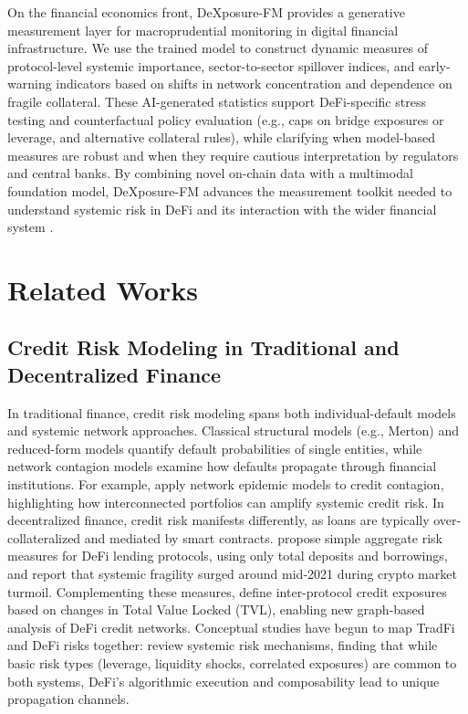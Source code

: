 \documentclass[preprint,12pt]{elsarticle}
\begin{document}
On the financial economics front, DeXposure-FM provides a generative measurement layer for macroprudential monitoring in digital financial infrastructure. We use the trained model to construct dynamic measures of protocol-level systemic importance, sector-to-sector spillover indices, and early-warning indicators based on shifts in network concentration and dependence on fragile collateral. These AI-generated statistics support DeFi-specific stress testing and counterfactual policy evaluation (e.g., caps on bridge exposures or leverage, and alternative collateral rules), while clarifying when model-based measures are robust and when they require cautious interpretation by regulators and central banks. By combining novel on-chain data with a multimodal foundation model, DeXposure-FM advances the measurement toolkit needed to understand systemic risk in DeFi and its interaction with the wider financial system \cite{naifar2025mapping,aufiero2025mapping}. \section{Related Works}







\subsection{Credit Risk Modeling in Traditional and Decentralized Finance}
In traditional finance, credit risk modeling spans both individual-default models and systemic network approaches.  Classical structural models (e.g., Merton) and reduced-form models quantify default probabilities of single entities, while network contagion models examine how defaults propagate through financial institutions.  For example, \cite{Dolfin2019} apply network epidemic models to credit contagion, highlighting how interconnected portfolios can amplify systemic credit risk.  
In decentralized finance, credit risk manifests differently, as loans are typically over-collateralized and mediated by smart contracts.  \cite{Bertomeu2024} propose simple aggregate risk measures for DeFi lending protocols, using only total deposits and borrowings, and report that systemic fragility surged around mid-2021 during crypto market turmoil.  Complementing these measures, \cite{wu2025} define inter-protocol credit exposures based on changes in Total Value Locked (TVL), enabling new graph-based analysis of DeFi credit networks.  Conceptual studies have begun to map TradFi and DeFi risks together: \cite{Aufiero2025} review systemic risk mechanisms, finding that while basic risk types (leverage, liquidity shocks, correlated exposures) are common to both systems, DeFi's algorithmic execution and composability lead to unique propagation channels.
\end{document}
